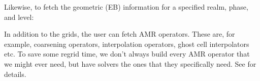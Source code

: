 \documentclass[letterpaper,10pt,english]{sphinxmanual}
\begin{document}
\sphinxAtStartPar
Likewise, to fetch the geometric (EB) information for a specified realm, phase, and level:

\begin{sphinxVerbatim}[commandchars=\\\{\},formatcom=\scriptsize]
  
  
  

     \PYG{p}{[}\PYG{p}{]}
\end{sphinxVerbatim}

\sphinxAtStartPar
In addition to the grids, the user can fetch AMR operators.
These are, for example, coarsening operators, interpolation operators, ghost cell interpolators etc.
To save some regrid time, we don’t always build every AMR operator that we might ever need, but have solvers  the ones that they specifically need.
See {\hyperref[\detokenize{Source/Realm:chap-realm}]{}} for details.
\end{document}
